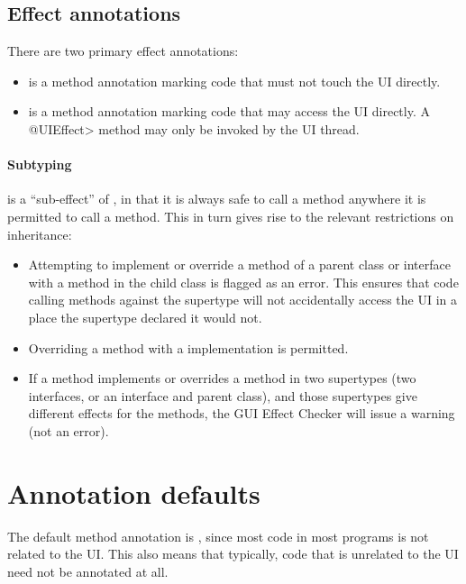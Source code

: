 \subsection{Effect annotations\label{guieffects-method-annotations}}
There are two primary effect annotations:
\begin{itemize}
\item {} is a method annotation marking code that must not touch the UI directly.
\item {} is a method annotation marking code that may access
  the UI directly.
  A \<@UIEffect> method may only be invoked by the UI thread.
\end{itemize}

\paragraph{Subtyping}
 is a ``sub-effect'' of , in that it is always safe to
call a  method anywhere it is permitted to call a  method.  This
in turn gives rise to the relevant restrictions on inheritance:
\begin{itemize}
\item Attempting to implement or override a  method of a parent class or interface
with a  method in the child class is flagged as an error.  This ensures that
code calling methods against the supertype will not accidentally access the UI in a place the
supertype declared it would not.
\item Overriding a  method with a  implementation is permitted.
\item If a method implements or overrides a method in two supertypes (two interfaces, or an
interface and parent class), and those supertypes give different effects for the methods, the
GUI Effect Checker will issue a warning (not an error).
\end{itemize}

\section{Annotation defaults\label{guieffects-defaults}}
The default method annotation is , since most code in most programs is not related
to the UI\@.  This also means that typically, code that is unrelated to the UI need not be annotated
at all.

